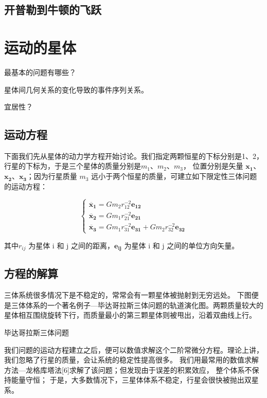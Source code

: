 \documentclass[a4paper,10.5pt]{book}
\begin{document}
\section{开普勒到牛顿的飞跃}




\chapter{运动的星体}

最基本的问题有哪些？

星体间几何关系的变化导致的事件序列关系。

宜居性？

\section{运动方程}

下面我们先从星体的动力学方程开始讨论。我们指定两颗恒星的下标分别是1、2，行星的下标为，于是三个星体的质量分别是$m_1$、$m_2$、$m_3$，
位置分别是矢量 $\mathbf{x_1}$、$\mathbf{x_2}$、$\mathbf{x_3}$；因为行星质量 $m_3$ 远小于两个恒星的质量，可建立如下限定性三体问题的运动方程：

$$
\begin{cases}
\ddot{\mathbf{x_1}} = Gm_2r_{12}^{-2} \mathbf{e_{12}}\\
\ddot{\mathbf{x_2}} = Gm_1r_{21}^{-2} \mathbf{e_{21}}\\
\ddot{\mathbf{x_3}} = Gm_1r_{31}^{-2} \mathbf{e_{31}} + Gm_2r_{32}^{-2} \mathbf{e_{32}}
\end{cases}
$$

其中$r_{ij}$ 为星体 i 和 j 之间的距离，$\mathbf{e_{ij}}$ 为星体 i 和 j 之间的单位方向矢量。

\section{方程的解算}

三体系统很多情况下是不稳定的，常常会有一颗星体被抛射到无穷远处。
下图便是三体体系的一个著名例子—毕达哥拉斯三体问题的轨道演化图。两颗质量较大的星体相互围绕旋转下行，而质量最小的第三颗星体则被甩出，沿着双曲线上行。

毕达哥拉斯三体问题

我们问题的运动方程建立之后，便可以数值求解这个二阶常微分方程。理论上讲，我们忽略了行星的质量，会让系统的稳定性提高很多。
我们用最常用的数值求解方法—龙格库塔法[6]求解了该问题；但发现由于误差的积累效应， 整个体系不保持能量守恒；
于是，大多数情况下，三星体体系不稳定，行星会很快被抛出双星系。
\end{document}
